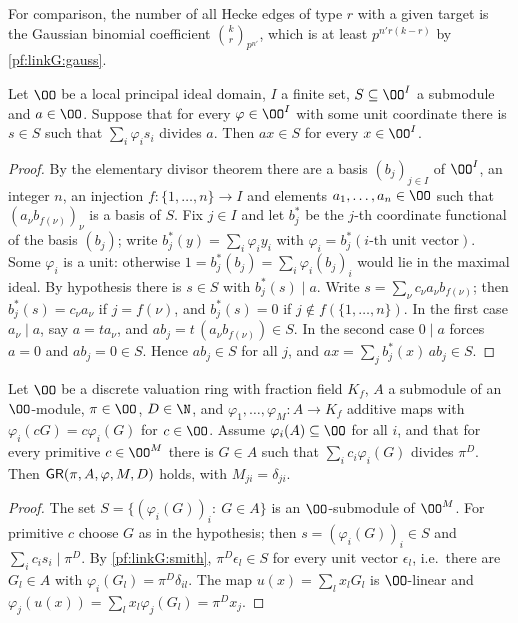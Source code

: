 For comparison, the number of all Hecke edges of type $r$ with a given target is the Gaussian binomial coefficient
$\binom{k}{r}_{p^{n'}}$, which is at least $p^{n'r(k-r)}$ by \cref{pf:linkG:gauss}.

\begin{lemma}\label{pf:linkG:smith}
Let $\OO$ be a local principal ideal domain, $I$ a finite set, $S\subseteq\OO^I$ a submodule and $a\in\OO$.
Suppose that for every $\varphi\in\OO^I$ with some unit coordinate there is $s\in S$ such that $\sum_i\varphi_is_i$
divides $a$. Then $ax\in S$ for every $x\in\OO^I$.
\end{lemma}

\begin{proof}
By the elementary divisor theorem there are a basis $(b_j)_{j\in I}$ of $\OO^I$, an integer $n$, an injection
$f:\{1,\dots,n\}\to I$ and elements $a_1,\dots,a_n\in\OO$ such that $(a_\nu b_{f(\nu)})_\nu$ is a basis of $S$. Fix
$j\in I$ and let $b_j^*$ be the $j$-th coordinate functional of the basis $(b_j)$; write $b_j^*(y)=\sum_i\varphi_iy_i$
with $\varphi_i=b_j^*(\text{$i$-th unit vector})$. Some $\varphi_i$ is a unit: otherwise
$1=b_j^*(b_j)=\sum_i\varphi_i(b_j)_i$ would lie in the maximal ideal. By hypothesis there is $s\in S$ with
$b_j^*(s)\mid a$. Write $s=\sum_\nu c_\nu a_\nu b_{f(\nu)}$; then $b_j^*(s)=c_\nu a_\nu$ if $j=f(\nu)$, and
$b_j^*(s)=0$ if $j\notin f(\{1,\dots,n\})$. In the first case $a_\nu\mid a$, say $a=ta_\nu$, and
$ab_j=t\,(a_\nu b_{f(\nu)})\in S$. In the second case $0\mid a$ forces $a=0$ and $ab_j=0\in S$. Hence $ab_j\in S$ for
all $j$, and $ax=\sum_jb_j^*(x)\,ab_j\in S$.
\end{proof}

\begin{lemma}\label{pf:linkG:goodrank}
Let $\OO$ be a discrete valuation ring with fraction field $K_f$, $A$ a submodule of an $\OO$-module, $\pi\in\OO$,
$D\in\N$, and $\varphi_1,\dots,\varphi_M:A\to K_f$ additive maps with $\varphi_i(cG)=c\varphi_i(G)$ for $c\in\OO$. Assume
$\varphi_i(A)\subseteq\OO$ for all $i$, and that for every primitive $c\in\OO^M$ there is $G\in A$ such that
$\sum_ic_i\varphi_i(G)$ divides $\pi^D$. Then $\mathsf{GR}(\pi,A,\varphi,M,D)$ holds, with $M_{ji}=\delta_{ji}$.
\end{lemma}

\begin{proof}
The set $S=\{(\varphi_i(G))_i:\ G\in A\}$ is an $\OO$-submodule of $\OO^M$. For primitive $c$ choose $G$ as in the
hypothesis; then $s=(\varphi_i(G))_i\in S$ and $\sum_ic_is_i\mid\pi^D$. By \cref{pf:linkG:smith},
$\pi^D\epsilon_l\in S$ for every unit vector $\epsilon_l$, i.e.\ there are $G_l\in A$ with
$\varphi_i(G_l)=\pi^D\delta_{il}$. The map $u(x)=\sum_lx_lG_l$ is $\OO$-linear and
$\varphi_j(u(x))=\sum_lx_l\varphi_j(G_l)=\pi^Dx_j$.
\end{proof}

